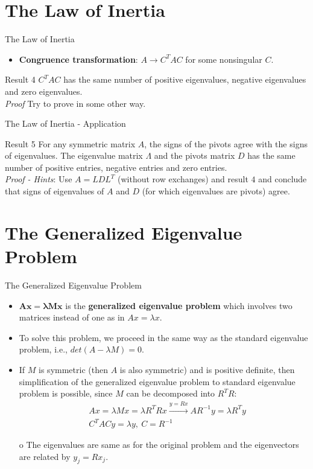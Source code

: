 \documentclass{beamer}
\begin{document}
\section{The Law of Inertia}
\begin{frame}{The Law of Inertia}{}
\begin{itemize}
    \item {
        \textbf{Congruence transformation}: $A \rightarrow C^TAC$ for some nonsingular $C$.
    }
\end{itemize}
\begin{block}{Result 4}
$C^TAC$ has the same number of positive eigenvalues, negative eigenvalues and zero eigenvalues.\\
\textit{Proof} Try to prove in some other way.
\end{block}
\end{frame}

\begin{frame}{The Law of Inertia - Application}
\begin{block}{Result 5}
For any symmetric matrix $A$, the signs of the pivots agree with the signs of eigenvalues. The eigenvalue matrix $\Lambda$ and the pivots matrix $D$ has the same number of positive entries, negative entries and zero entries.\\
\textit{Proof - Hints}: Use $A = LDL^T$ (without row exchanges) and result $4$ and conclude that signs of eigenvalues of $A$ and $D$ (for which eigenvalues are pivots) agree.
\end{block}
\end{frame}

\section{The Generalized Eigenvalue Problem}
\begin{frame}{The Generalized Eigenvalue Problem}
\begin{itemize}
    \item {
        $\mathbf{Ax = \lambda Mx}$ is the \textbf{generalized eigenvalue problem} which involves two matrices instead of one as in $Ax = \lambda x$.
    }
    \item {
        To solve this problem, we proceed in the same way as the standard eigenvalue problem, i.e., $det(A-\lambda M) = 0$.
    }
    \item {
        If $M$ is symmetric (then $A$ is also symmetric) and is positive definite, then simplification of the generalized eigenvalue problem to standard eigenvalue problem is possible, since $M$ can be decomposed into $R^TR$:
        \begin{align*}
            &Ax = \lambda Mx = \lambda R^TRx \xrightarrow{y = Rx} AR^{-1}y = \lambda R^Ty\\
            &C^TACy = \lambda y, \ C = R^{-1}
        \end{align*}
    }
    \item[o] {
        The eigenvalues are same as for the original problem and the eigenvectors are related by $y_j = Rx_j$.
    }
\end{itemize}
\end{frame}
\end{document}
